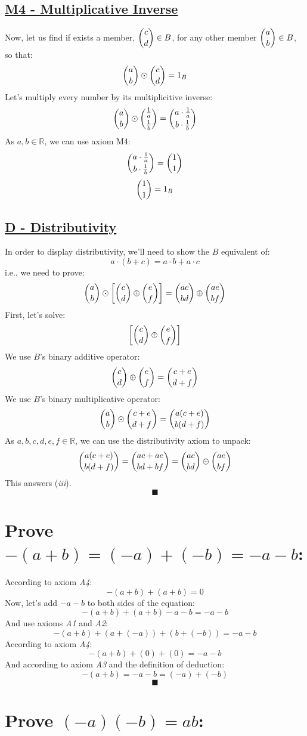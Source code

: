 \documentclass[a4paper, 12pt]{article}
\newcommand{\sub}[1]{\subsection{\underline{#1}}}
\newcommand{\?}{\stackrel{?}{=}}
\newcommand{\R}{\ensuremath{\mathbb{R}}}
\renewcommand{\qed}{$$\blacksquare$$}
\begin{document}
    \sub{M4 - Multiplicative Inverse}
        Now, let us find if exists a member, $\dbinom{c}{d} \in{B}$, for any other member $\dbinom{a}{b} \in{B}$, so that:
        $$ \dbinom{a}{b}\odot\dbinom{c}{d} = 1_{B} $$
        Let's multiply every number by its multiplicitive inverse:
        $$ \dbinom{a}{b}\odot\dbinom{\frac{1}{a}}{\frac{1}{b}}=\dbinom{a\cdot{\frac{1}{a}}}{b\cdot{\frac{1}{b}}} $$
        As $a,b \in {\R}$, we can use axiom M4:
        $$ \dbinom{a\cdot{\frac{1}{a}}}{b\cdot{\frac{1}{b}}} = \dbinom{1}{1} $$
        $$ \dbinom{1}{1} = 1_{B} $$

    \sub{D - Distributivity}
    In order to display distributivity, we'll need to show the $B$ equivalent of:
    $$ a\cdot{(b+c)}=a\cdot{b}+a\cdot{c} $$
    i.e., we need to prove:
    $$ \dbinom{a}{b} \odot \bigg{[} \dbinom{c}{d} \oplus \dbinom{e}{f} \bigg{]} = \dbinom{ac}{bd} \oplus \dbinom{ae}{bf} $$
    First, let's solve: $$ \bigg{[} \dbinom{c}{d} \oplus \dbinom{e}{f} \bigg{]} $$
    We use $B$'s binary additive operator:
    $$ \dbinom{c}{d} \oplus \dbinom{e}{f} = \dbinom{c+e}{d+f} $$
    We use $B$'s binary multiplicative operator: $$ \dbinom{a}{b} \odot \dbinom{c+e}{d+f} = \dbinom{a(c+e)}{b(d+f)} $$
    As $a,b,c,d,e,f \in {\R}$, we can use the distributivity axiom to unpack:
    $$ \dbinom{a(c+e)}{b(d+f)} = \dbinom{ac+ae}{bd+bf} = \dbinom{ac}{bd} \oplus \dbinom{ae}{bf} $$
    This answers (\textit{iii}).
    \qed
    \pagebreak

\setcounter{section}{22}
\section{Prove $-(a+b)=(-a)+(-b)=-a-b$:}
According to axiom \textit{A4}: $$ -(a+b) + (a+b) = 0$$
Now, let's add $-a-b$ to both sides of the equation: $$ -(a+b)+(a+b)-a-b=-a-b $$
And use axioms \textit{A1} and \textit{A2}: $$ -(a+b)+(a+(-a))+(b+(-b))=-a-b $$
According to axiom \textit{A4}: $$ -(a+b)+(0)+(0)=-a-b $$
And according to axiom \textit{A3} and the definition of deduction: $$ -(a+b)=-a-b=(-a)+(-b) $$
\qed

\setcounter{section}{25}
\section{Prove $ (-a)(-b) = ab $:}


\end{document}
